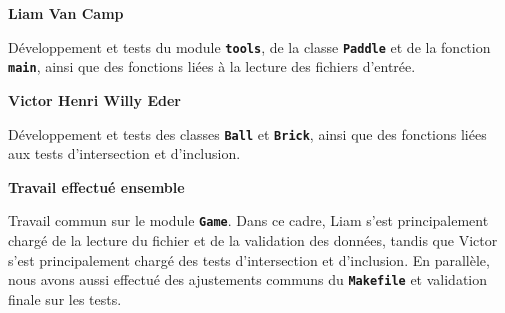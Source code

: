 \documentclass[10pt,a4paper]{article}
\begin{document}
\begin{list}{}{\leftmargin=0.5cm \rightmargin=0cm}
\item
    {\normalsize \textbf{Liam Van Camp}}

    \begin{list}{}{\leftmargin=0.5cm \rightmargin=0cm}
    \item
    D\'eveloppement et tests du module \textbf{\texttt{tools}},
    de la classe \textbf{\texttt{Paddle}}
    et de la fonction \textbf{\texttt{main}},
    ainsi que des fonctions li\'ees
    \`a la lecture des fichiers d'entr\'ee.
    \end{list}

    {\normalsize \textbf{Victor Henri Willy Eder}}

    \begin{list}{}{\leftmargin=0.5cm \rightmargin=0cm}
    \item
    D\'eveloppement et tests des classes
    \textbf{\texttt{Ball}} et \textbf{\texttt{Brick}},
    ainsi que des fonctions li\'ees
    aux tests d'intersection
    et d'inclusion.
    \end{list}

    {\normalsize \textbf{Travail effectu\'e ensemble}}

    \begin{list}{}{\leftmargin=0.5cm \rightmargin=0cm}
    \item
    Travail commun sur le module \textbf{\texttt{Game}}.
    Dans ce cadre, Liam s'est principalement charg\'e
    de la lecture du fichier et de la validation des donn\'ees,
    tandis que Victor s'est principalement charg\'e
    des tests d'intersection et d'inclusion.
    En parall\`ele, nous avons aussi effectu\'e
    des ajustements communs du \textbf{\texttt{Makefile}}
    et validation finale sur les tests.
    \end{list}
\end{list}
\end{document}
